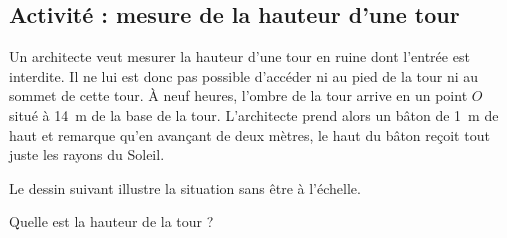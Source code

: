 

\subsection*{Activité : mesure de la hauteur d'une tour}



Un architecte veut mesurer la hauteur d'une tour en ruine dont l'entrée est interdite. Il ne lui est donc pas possible d'accéder ni au pied de la tour ni au sommet de cette tour. À neuf heures, l'ombre de la tour arrive en un point \( O\) situé à \SI{14}{\meter} de la base de la tour. L'architecte prend alors un bâton de \SI{1}{\meter} de haut et remarque qu'en avançant de deux mètres, le haut du bâton reçoit tout juste les rayons du Soleil.

Le dessin suivant illustre la situation sans être à l'échelle.

\begin{center}
   
\end{center}

Quelle est la hauteur de la tour ?
